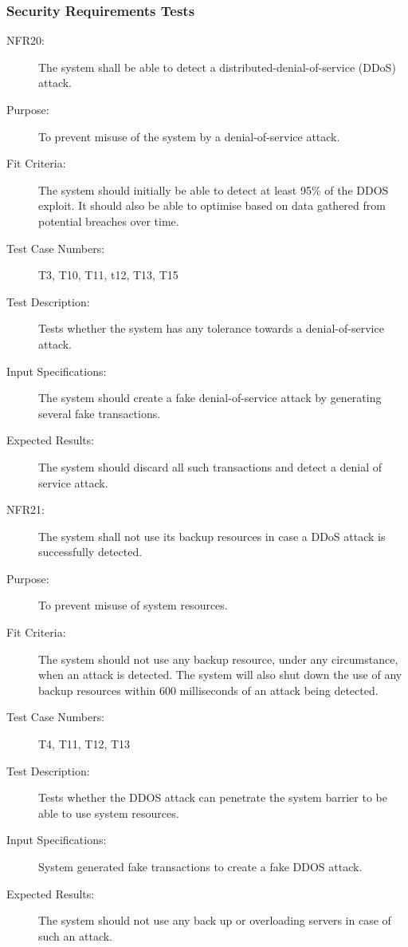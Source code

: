 \documentclass[a4paper,twoside,phd]{BYUPhys}
\begin{document}
\subsubsection{Security Requirements Tests}
\begin{description}
\item[NFR20:] The system shall be able to detect a distributed-denial-of-service (DDoS) attack.
\item[Purpose:] To prevent misuse of the system by a denial-of-service attack.
\item[Fit Criteria:] The system should initially be able to detect at least 95\% of the DDOS exploit. It should also be able to optimise based on data gathered from potential breaches over time.
\item[Test Case Numbers:] T3, T10, T11, t12, T13, T15
\item[Test Description:] Tests whether the system has any tolerance towards a denial-of-service attack.
\item[Input Specifications:] The system should create a fake denial-of-service attack by generating several fake transactions.
\item[Expected Results:] The system should discard all such transactions and detect a denial of service attack.

\item[NFR21:] The system shall not use its backup resources in case a DDoS attack is successfully detected.
\item[Purpose:] To prevent misuse of system resources.
\item[Fit Criteria:] The system should not use any backup resource, under any circumstance, when an attack is detected. The system will also shut down the use of any backup resources within 600 milliseconds of an attack being detected.
\item[Test Case Numbers:] T4, T11, T12, T13
\item[Test Description:] Tests whether the DDOS attack can penetrate the system barrier to be able to use system resources.
\item[Input Specifications:] System generated fake transactions to create a fake DDOS attack.
\item[Expected Results:] The system should not use any back up or overloading servers in case of such an attack.


\end{description}
\end{document}
